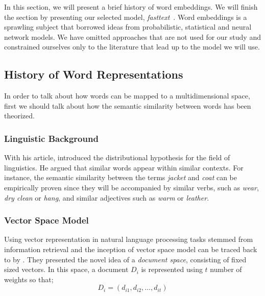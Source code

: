 In this section, we will present a brief history of word embeddings.
We will finish the section by presenting our selected model, \emph{fasttext}~\cite{mikolov2018advances}.
Word embeddings is a sprawling subject that borrowed ideas from probabilistic, statistical and neural network models.
We have omitted approaches that are not used for our study and constrained ourselves only to the literature that lead up to the model we will use. %

\subsection{History of Word Representations}%
\label{sub:history_of_word_representations}

In order to talk about how words can be mapped to a multidimensional space, first we should talk about how the semantic similarity between words has been theorized.

\subsubsection{Linguistic Background}%
\label{ssub:linguistic_background}

With his \citeyear{harris_distributional_1954} article, \textcite{harris_distributional_1954} introduced the distributional hypothesis for the field of linguistics.
He argued that similar words appear within similar contexts.
For instance, the semantic similarity between the terms \emph{jacket} and \emph{coat} can be empirically proven since they will be accompanied by similar verbs, such as \emph{wear}, \emph{dry clean} or \emph{hang}, and similar adjectives such as \emph{warm} or \emph{leather}.

\subsubsection{Vector Space Model}%
\label{ssub:vector_space_model}

Using vector representation in natural language processing tasks stemmed from information retrieval and the inception of vector space model can be traced back to  by \textcite{salton_vector_1975}.
They presented the novel idea of a \emph{document space}, consisting of fixed sized vectors.
In this space, a document $D_i$ is represented using $t$ number of weights so that;
\begin{displaymath}
    D_{i} = (d_{i1}, d_{i2}, \ldots, d_{it})
\end{displaymath}

